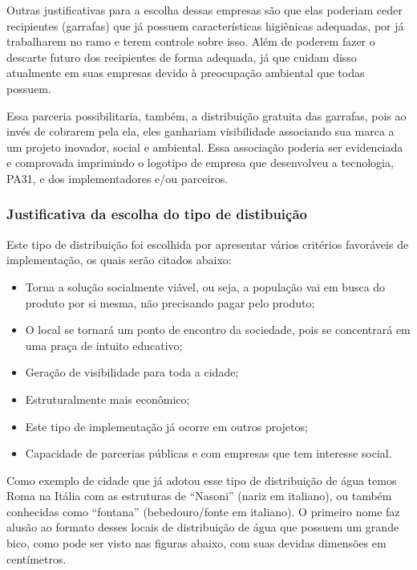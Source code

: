     Outras justificativas para a escolha dessas empresas são que elas poderiam ceder recipientes (garrafas) que já possuem características higiênicas adequadas, por já trabalharem no ramo e terem controle sobre isso. Além de poderem fazer o descarte futuro dos recipientes de forma adequada, já que cuidam disso atualmente em suas empresas devido à preocupação ambiental que todas possuem.
    
    Essa parceria possibilitaria, também, a distribuição gratuita das garrafas, pois ao invés de cobrarem pela ela, eles ganhariam visibilidade associando sua marca a um projeto inovador, social e ambiental. Essa associação poderia ser evidenciada e comprovada imprimindo o logotipo de empresa que desenvolveu a tecnologia, PA31, e dos implementadores e/ou parceiros.
    
    \subsubsection{Justificativa da escolha do tipo de distibuição}
    
      Este tipo de distribuição foi escolhida por apresentar vários critérios favoráveis de implementação, os quais serão citados abaixo:
      
      \begin{itemize}
       \item Torna a solução socialmente viável, ou seja, a população vai em busca do produto por si mesma, não precisando pagar pelo produto;
       \item O local se tornará um ponto de encontro da sociedade, pois se concentrará em uma praça de intuito educativo;
       \item Geração de visibilidade para toda a cidade;
       \item Estruturalmente mais econômico;
       \item Este tipo de implementação já ocorre em outros projetos;
       \item Capacidade de parcerias públicas e com empresas que tem interesse social.
      \end{itemize}

	Como exemplo de cidade que já adotou esse tipo de distribuição de água temos Roma na Itália com as estruturas de “Nasoni” (nariz em italiano), ou também conhecidas como “fontana” (bebedouro/fonte em italiano). O primeiro nome faz alusão ao formato desses locais de distribuição de água que possuem um grande bico, como pode ser visto nas figuras abaixo, com suas devidas dimensões em centímetros\cite{rodrigues}. 
	
